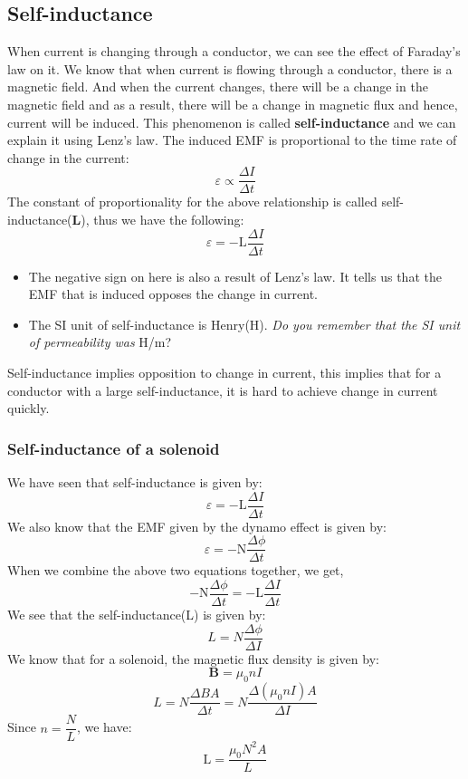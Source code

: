 \documentclass[11pt]{article}
\begin{document}
	\subsection*{Self-inductance}
	When current is changing through a conductor, we can see the effect of Faraday's law on it. We know that when current is flowing through a conductor, there is a magnetic field. And when the current changes, there will be a change in the magnetic field and as a result, there will be a change in magnetic flux and hence, current will be induced. This phenomenon is called \textbf{self-inductance} and we can explain it using Lenz's law. The induced EMF is proportional to the time rate of change in the current:
	$$\varepsilon\propto\dfrac{\Delta I}{\Delta t}$$
	The constant of proportionality for the above relationship is called self-inductance(\textbf{L}), thus we have the following:
	$$\varepsilon=-\text{L}\dfrac{\Delta I}{\Delta t}$$
	\begin{itemize}
		\item The negative sign on here is also a result of Lenz's law. It tells us that the EMF that is induced opposes the change in current.
		\item The SI unit of self-inductance is Henry(H). \textit{Do you remember that the SI unit of permeability was} H/m?
	\end{itemize}
	Self-inductance implies opposition to change in current, this implies that for a conductor with a large self-inductance, it is hard to achieve change in current quickly.
	\subsubsection*{Self-inductance of a solenoid}
	We have seen that self-inductance is given by:
	$$\varepsilon=-\text{L}\dfrac{\Delta I}{\Delta t}$$
	We also know that the EMF given by the dynamo effect is given by:
	$$\varepsilon=-\text{N}\dfrac{\Delta\phi}{\Delta t}$$
	When we combine the above two equations together, we get, 
	$$-\text{N}\dfrac{\Delta\phi}{\Delta t}=-\text{L}\dfrac{\Delta I}{\Delta t }$$
	We see that the self-inductance(L) is given by:
	$$L=N\dfrac{\Delta\phi}{\Delta I}$$
	We know that for a solenoid, the magnetic flux density is given by:
	$$\textbf{B}=\mu_0nI$$
	$$L=N\dfrac{\Delta BA}{\Delta t}=N\dfrac{\Delta (\mu_0nI)A}{\Delta I}$$
	Since $n=\dfrac{N}{L}$, we have:
	$$\text{L}=\dfrac{\mu_0N^2A}{L}$$
\end{document}
